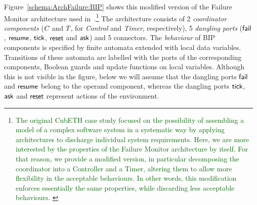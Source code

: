 \documentclass[smallcondensed]{svjour3}
\newcommand{\Simon}[1]{\textcolor{darkgreen}{#1}}
\newcommand{\mdash}{---}
\newcommand{\resp}[1][\ ]{resp.#1}
\newcommand{\goesto}[2][]{\ensuremath{\xrightarrow[#1]{#2}}}
\newcommand{\true}{\ensuremath{\mathit{true}}}
\begin{document}
Figure~\ref{schema:ArchFailure:BIP} shows this modified version of the
Failure Monitor architecture used in~\cite{CubETH-case-study}.\footnote{%
%
  \Simon{%
  The original CubETH case study \cite{CubETH-case-study} focused on
  the possibility of assembling a model of a complex software system
  in a systematic way by applying architectures to discharge
  individual system requirements.  Here, we are more interested by the
  properties of the Failure Monitor architecture by itself.  For that
  reason, we provide a modified version, in particular decomposing the
  coordinator into a Controller and a Timer, altering them to allow
  more flexibility in the acceptable behaviours.  In other words, this
  modification enforces essentially the same properties, while
  discarding less acceptable behaviours.
  }
%
} The architecture consists of 2 \emph{coordinator components}
($C_{}$ and $T_{}$, for \emph{Control} and \emph{Timer},
respectively), 5 \emph{dangling ports} ($\mathsf{fail}_{}$, $\mathsf{resume}_{}$,
$\mathsf{tick}$, $\mathsf{reset}$ and $\mathsf{ask}$) and 5 connectors.
%
The  \emph{behaviour} of BIP components %
is specified by finite automata extended with
local data variables.  Transitions of these automata are labelled with
the ports of the corresponding components, Boolean guards and update
functions on local variables.  %
Although this is not visible in the figure, below we will assume that
the dangling ports $\mathsf{fail}_{}$ and $\mathsf{resume}_{}$ belong to the operand
component, whereas the dangling ports $\mathsf{tick}$, $\mathsf{ask}$ and
$\mathsf{reset}$ represent actions of the environment.  
\end{document}
